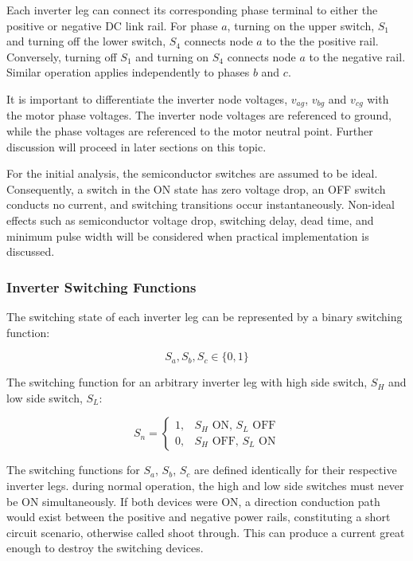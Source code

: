 \documentclass{article}
\begin{document}
Each inverter leg can connect its corresponding phase terminal to either the positive or negative DC link rail. For phase $a$, turning on the upper switch, $S_1$ and turning off the lower switch, $S_4$ connects node $a$ to the the positive rail. Conversely, turning off $S_1$ and turning on $S_4$ connects node $a$ to the negative rail. Similar operation applies independently to phases $b$ and $c$.

It is important to differentiate the inverter node voltages, $v_{ag}$, $v_{bg}$ and $v_{cg}$ with the motor phase voltages. The inverter node voltages are referenced to ground, while the phase voltages are referenced to the motor neutral point. Further discussion will proceed in later sections on this topic. 

For the initial analysis, the semiconductor switches are assumed to be ideal. Consequently, a switch in the ON state has zero voltage drop, an OFF switch conducts no current, and switching transitions occur instantaneously. Non-ideal effects such as semiconductor voltage drop, switching delay, dead time, and minimum pulse width will be considered when practical implementation is discussed.


\subsubsection{Inverter Switching Functions}
\label{sec:inverter-switching-functions}


The switching state of each inverter leg can be represented by a binary switching function:

\[
    S_a, S_b, S_c \in \{0, 1\}
\]

The switching function for an arbitrary inverter leg with high side switch, $S_H$ and low side switch, $S_L$:

\[
S_n =
\begin{cases}
    1, & S_H \text{ ON, } S_L \text{ OFF}\\[4pt]
    0, & S_H \text{ OFF, } S_L \text{ ON}
\end{cases}
\]

The switching functions for $S_a$, $S_b$, $S_c$ are defined identically for their respective inverter legs. during normal operation, the high and low side switches must never be ON simultaneously. If both devices were ON, a direction conduction path would exist between the positive and negative power rails, constituting a short circuit scenario, otherwise called shoot through. This can produce a current great enough to destroy the switching devices.
\end{document}
